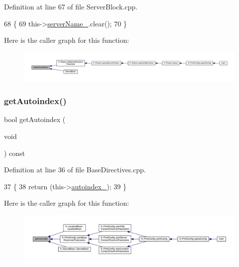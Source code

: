 Definition at line 67 of file Server\+Block.\+cpp.


\begin{DoxyCode}
68     \{
69         this->\hyperlink{classft_1_1_server_block_adc26ae834350b4c964d4198e7a431e90}{serverName\_}.clear();
70     \}
\end{DoxyCode}
Here is the caller graph for this function\+:
\nopagebreak
\begin{figure}[H]
\begin{center}
\leavevmode
\includegraphics[width=350pt]{classft_1_1_server_block_aaf4aa7d96124b157e91274eb88c77808_icgraph}
\end{center}
\end{figure}
\mbox{\label{classft_1_1_base_directives_a4c11ed7ad76aeac228b029a2444de568}} 
\subsubsection{\texorpdfstring{get\+Autoindex()}{getAutoindex()}}
{\footnotesize\ttfamily bool get\+Autoindex (\begin{DoxyParamCaption}\item[{void}]{ }\end{DoxyParamCaption}) const\hspace{0.3cm}{\ttfamily [inherited]}}



Definition at line 36 of file Base\+Directives.\+cpp.


\begin{DoxyCode}
37     \{
38         \textcolor{keywordflow}{return} (this->\hyperlink{classft_1_1_base_directives_a4ebffbe32f50a462afa139c6f03c1a4f}{autoindex\_});
39     \}
\end{DoxyCode}
Here is the caller graph for this function\+:
\nopagebreak
\begin{figure}[H]
\begin{center}
\leavevmode
\includegraphics[width=350pt]{classft_1_1_base_directives_a4c11ed7ad76aeac228b029a2444de568_icgraph}
\end{center}
\end{figure}
\mbox{\label{classft_1_1_base_directives_a930398ba1e4b99b2ba01a60dcda0c923}} 
